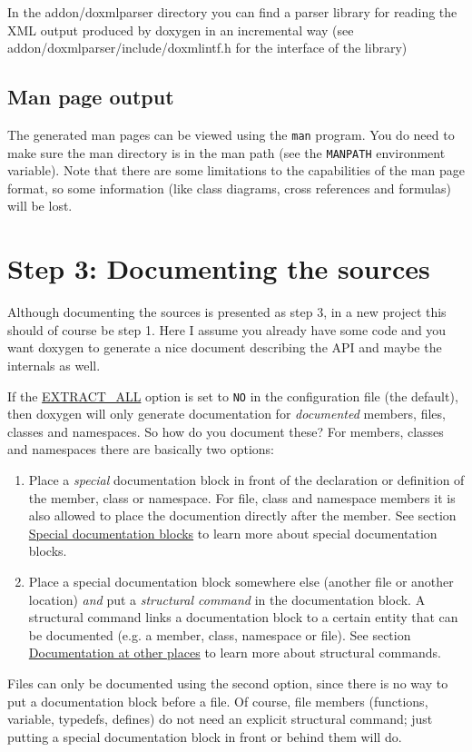 In the addon/doxmlparser directory you can find a parser library for reading the XML output produced by doxygen in an incremental way (see addon/doxmlparser/include/doxmlintf.h for the interface of the library)\hypertarget{starting_man_out}{}\subsection{Man page output}\label{starting_man_out}
The generated man pages can be viewed using the {\tt man} program. You do need to make sure the man directory is in the man path (see the {\tt MANPATH} environment variable). Note that there are some limitations to the capabilities of the man page format, so some information (like class diagrams, cross references and formulas) will be lost.\hypertarget{starting_step3}{}\section{Step 3: Documenting the sources}\label{starting_step3}
Although documenting the sources is presented as step 3, in a new project this should of course be step 1. Here I assume you already have some code and you want doxygen to generate a nice document describing the API and maybe the internals as well.

If the \hyperlink{config_cfg_extract_all}{EXTRACT\_\-ALL} option is set to {\tt NO} in the configuration file (the default), then doxygen will only generate documentation for {\em documented\/} members, files, classes and namespaces. So how do you document these? For members, classes and namespaces there are basically two options: \begin{enumerate}
\item Place a {\em special\/} documentation block in front of the declaration or definition of the member, class or namespace. For file, class and namespace members it is also allowed to place the documention directly after the member. See section \hyperlink{docblocks_specialblock}{Special documentation blocks} to learn more about special documentation blocks. \item Place a special documentation block somewhere else (another file or another location) {\em and\/} put a {\em structural command\/} in the documentation block. A structural command links a documentation block to a certain entity that can be documented (e.g. a member, class, namespace or file). See section \hyperlink{docblocks_structuralcommands}{Documentation at other places} to learn more about structural commands. \end{enumerate}
Files can only be documented using the second option, since there is no way to put a documentation block before a file. Of course, file members (functions, variable, typedefs, defines) do not need an explicit structural command; just putting a special documentation block in front or behind them will do.

